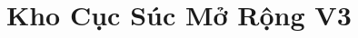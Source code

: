 \documentclass[14pt,a4paper,twoside]{extbook}
\begin{document}




\frontmatter
\tableofcontents
\clearpage


\mainmatter




\part{Kho Cục Súc Mở Rộng V3}



\backmatter
\end{document}
